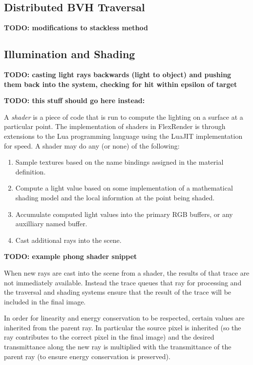 \documentclass[12pt]{ucthesis}
\begin{document}
\subsection{Distributed BVH Traversal}
\label{traversal}

\textbf{TODO: modifications to stackless method}

\subsection{Illumination and Shading}
\label{shading}

\textbf{TODO: casting light rays backwards (light to object) and pushing them back into the system, checking for hit within epsilon of target}

\textbf{TODO: this stuff should go here instead:}

A \emph{shader} is a piece of code that is run to compute the lighting on a
surface at a particular point. The implementation of shaders in FlexRender is
through extensions to the Lua \cite{lua} programming language using the LuaJIT
\cite{luajit} implementation for speed. A shader may do any (or none) of the
following:

\begin{enumerate}
    \item Sample textures based on the name bindings assigned in the material
        definition.
    \item Compute a light value based on some implementation of a mathematical
        shading model and the local informtion at the point being shaded.
    \item Accumulate computed light values into the primary RGB buffers, or
        any auxilliary named buffer.
    \item Cast additional rays into the scene.
\end{enumerate}

\textbf{TODO: example phong shader snippet}

When new rays are cast into the scene from a shader, the results of that trace
are not immediately available. Instead the trace queues that ray for processing
and the traversal and shading systems ensure that the result of the trace will be
included in the final image.

In order for linearity and energy conservation to be respected, certain values
are inherited from the parent ray. In particular the source pixel is inherited
(so the ray contributes to the correct pixel in the final image) and the
desired transmittance along the new ray is multiplied with the transmittance of
the parent ray (to ensure energy conservation is preserved).
\end{document}
